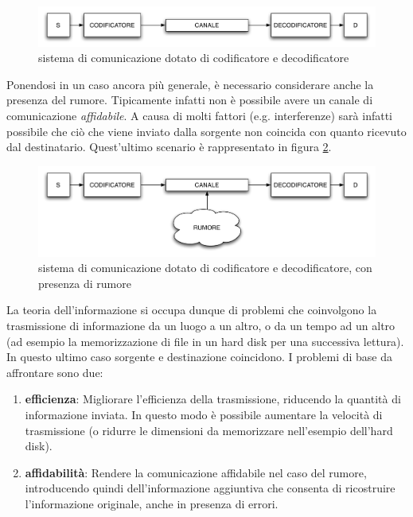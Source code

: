 \begin{figure}[htbp]
\begin{center}
	\includegraphics[width=\textwidth]{img/intro2.pdf}
\caption{sistema di comunicazione dotato di codificatore e decodificatore}
\label{fig:0006}
\end{center}
\end{figure}

Ponendosi in un caso ancora più generale, è necessario considerare anche la presenza del rumore. Tipicamente infatti non è possibile 
avere un canale di comunicazione \emph{affidabile}. A causa di molti fattori (e.g. interferenze) sarà infatti possibile che ciò che 
viene inviato dalla sorgente non coincida con quanto ricevuto dal destinatario. Quest'ultimo scenario è rappresentato in figura 
\ref{fig:0007}.

\begin{figure}[htbp]
\begin{center}
	\includegraphics[width=\textwidth]{img/intro3.pdf}
\caption{sistema di comunicazione dotato di codificatore e decodificatore, con presenza di rumore}
\label{fig:0007}
\end{center}
\end{figure}

La teoria dell'informazione si occupa dunque di problemi che coinvolgono la trasmissione di informazione da un luogo a un altro, o da un tempo ad un altro (ad esempio la memorizzazione di file in un hard disk per una successiva lettura). In questo ultimo caso 
sorgente e destinazione coincidono.
I problemi di base da affrontare sono due:
\begin{enumerate}
\item \textbf{efficienza}: Migliorare l'efficienza della trasmissione, riducendo la quantità di informazione inviata.
In questo modo è possibile aumentare la velocità di trasmissione (o ridurre le dimensioni da memorizzare nell'esempio dell'hard disk).
\item \textbf{affidabilità}: Rendere la comunicazione affidabile nel caso del rumore, introducendo quindi dell'informazione aggiuntiva 
che consenta di ricostruire l'informazione originale, anche in presenza di errori.
\end{enumerate}

